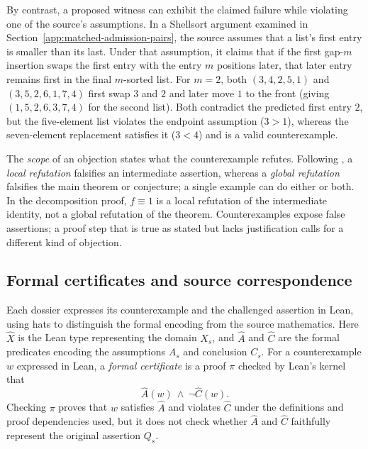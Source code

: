 By contrast, a proposed witness can exhibit the claimed failure while violating one of the source's assumptions. In a Shellsort argument examined in Section~\ref{app:matched-admission-pairs}, the source assumes that a list's first entry is smaller than its last. Under that assumption, it claims that if the first gap-$m$ insertion swaps the first entry with the entry $m$ positions later, that later entry remains first in the final $m$-sorted list. For $m=2$, both $(3,4,2,5,1)$ and $(3,5,2,6,1,7,4)$ first swap $3$ and $2$ and later move $1$ to the front (giving $(1,5,2,6,3,7,4)$ for the second list). Both contradict the predicted first entry $2$, but the five-element list violates the endpoint assumption ($3>1$), whereas the seven-element replacement satisfies it ($3<4$) and is a valid counterexample.

The \emph{scope} of an objection states what the counterexample refutes. Following \citet{lakatos1976proofs}, a \emph{local refutation} falsifies an intermediate assertion, whereas a \emph{global refutation} falsifies the main theorem or conjecture; a single example can do either or both. In the decomposition proof, $f\equiv 1$ is a local refutation of the intermediate identity, not a global refutation of the theorem. Counterexamples expose false assertions; a proof step that is true as stated but lacks justification calls for a different kind of objection.

\subsection{Formal certificates and source correspondence}
Each dossier expresses its counterexample and the challenged assertion in Lean, using hats to distinguish the formal encoding from the source mathematics. Here $\widehat X$ is the Lean type representing the domain $X_s$, and $\widehat A$ and $\widehat C$ are the formal predicates encoding the assumptions $A_s$ and conclusion $C_s$. For a counterexample $w$ expressed in Lean, a \emph{formal certificate} is a proof $\pi$ checked by Lean's kernel that
\begin{equation}
\widehat A(w)\ \wedge\ \neg\widehat C(w).
\label{eq:formal-witness}
\end{equation}
Checking $\pi$ proves that $w$ satisfies $\widehat A$ and violates $\widehat C$ under the definitions and proof dependencies used, but it does not check whether $\widehat A$ and $\widehat C$ faithfully represent the original assertion $Q_s$.

